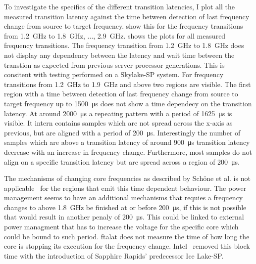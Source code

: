 To investigate the specifics of the different transition latencies, I plot all the measured transition latency against the time between detection of last frequency change from source to target frequency.
 show this for the frequency transitions from \SI{1.2}{\GHz} to \SI{1.8}{\GHz}, ..., \SI{2.9}{\GHz}.
 shows the plots for all measured frequency transitions.
The frequency transition from \SI{1.2}{\GHz} to \SI{1.8}{\GHz} does not display any dependency between the latency and wait time between the transtion as expected from previous server processor generations.
This is consitent with testing performed on a Skylake-SP system.
For frequency transitions from \SI{1.2}{\GHz} to \SI{1.9}{\GHz} and above two regions are visible.
The first region with a time between detection of last frequency change from source to target frequency up to \SI{1500}{\us} does not show a time dependecy on the transition latency.
At around \SI{2000}{\us} a repeating pattern with a period of \SI{1625}{\us} is visible.
It intern contains samples which are not spread across the x-axis as previous, but are aligned with a period of \SI{200}{\us}.
Interestingly the number of samples which are above a transition latency of around \SI{900}{\us} transition latency decrease with an increase in frequency change.
Furthermore, most samples do not align on a specific transition latency but are spread across a region of \SI{200}{\us}.

The mechanisms of changing core frequencies as described by Schöne et al. is not applicable~\cite{skylake_paper} for the regions that emit this time dependent behaviour.
The power management seems to have an additional mechanisms that requies a frequency changes to above \SI{1.8}{\GHz} be finished at or before \SI{200}{\us}, if this is not possible that would result in another penaly of \SI{200}{\us}.
This could be linked to external power managment that has to increase the voltage for the specific core which could be bound to such period.
ftalat does not measure the time of how long the core is stopping its execution for the frequency change.
Intel~\cite{Intel_2020_IceLake_SP} removed this block time with the introduction of Sapphire Rapids' predecessor Ice Lake-SP.

